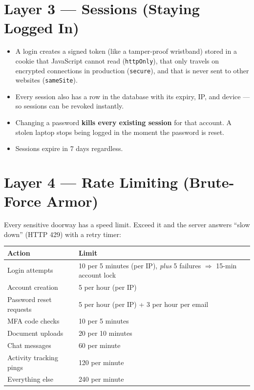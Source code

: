 \documentclass[11pt,letterpaper]{report}
\begin{document}
\section{Layer 3 --- Sessions (Staying Logged In)}

\begin{itemize}[leftmargin=1.4em]
  \item A login creates a signed token (like a tamper-proof wristband) stored in
        a cookie that JavaScript cannot read (\texttt{httpOnly}), that only
        travels on encrypted connections in production (\texttt{secure}), and
        that is never sent to other websites (\texttt{sameSite}).
  \item Every session also has a row in the database with its expiry, IP, and
        device --- so sessions can be revoked instantly.
  \item Changing a password \textbf{kills every existing session} for that
        account. A stolen laptop stops being logged in the moment the password
        is reset.
  \item Sessions expire in 7 days regardless.
\end{itemize}

\section{Layer 4 --- Rate Limiting (Brute-Force Armor)}

Every sensitive doorway has a speed limit. Exceed it and the server answers
``slow down'' (HTTP 429) with a retry timer:

\begin{center}
\begin{tabular}{ll}
\toprule
\textbf{Action} & \textbf{Limit} \\
\midrule
Login attempts            & 10 per 5 minutes (per IP), \emph{plus} 5 failures $\Rightarrow$ 15-min account lock \\
Account creation          & 5 per hour (per IP) \\
Password reset requests   & 5 per hour (per IP) + 3 per hour per email \\
MFA code checks           & 10 per 5 minutes \\
Document uploads          & 20 per 10 minutes \\
Chat messages             & 60 per minute \\
Activity tracking pings   & 120 per minute \\
Everything else           & 240 per minute \\
\bottomrule
\end{tabular}
\end{center}
\end{document}
